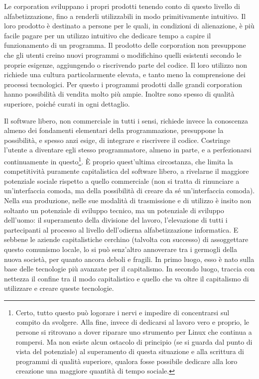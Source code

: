 \documentclass[../main]{subfiles}
\begin{document}
Le corporation sviluppano i propri prodotti tenendo conto di questo livello di alfabetizzazione, fino a renderli utilizzabili in modo primitivamente intuitivo. Il loro prodotto è destinato a persone per le quali, in condizioni di alienazione, è più facile pagare per un utilizzo intuitivo che dedicare tempo a capire il funzionamento di un programma. Il prodotto delle corporation non presuppone che gli utenti creino nuovi programmi o modifichino quelli esistenti secondo le proprie esigenze, aggiungendo o riscrivendo parte del codice. Il loro utilizzo non richiede una cultura particolarmente elevata, e tanto meno la comprensione dei processi tecnologici. Per questo i programmi prodotti dalle grandi corporation hanno possibilità di vendita molto più ampie. Inoltre sono spesso di qualità superiore, poiché curati in ogni dettaglio.

Il software libero, non commerciale in tutti i sensi, richiede invece la conoscenza almeno dei fondamenti elementari della programmazione, presuppone la possibilità, e spesso anzi esige, di integrare e riscrivere il codice. Costringe l'utente a diventare egli stesso programmatore, almeno in parte, e a perfezionarsi continuamente in questo\footnote{Certo, tutto questo può logorare i nervi e impedire di concentrarsi sul compito da svolgere. Alla fine, invece di dedicarsi al lavoro vero e proprio, le persone si ritrovano a dover riparare uno strumento per Linux che continua a rompersi. Ma non esiste alcun ostacolo di principio (se si guarda dal punto di vista del potenziale) al superamento di questa situazione e alla scrittura di programmi di qualità superiore, qualora fosse possibile dedicare alla loro creazione una maggiore quantità di tempo sociale.}. È proprio quest'ultima circostanza, che limita la competitività puramente capitalistica del software libero, a rivelarne il maggiore potenziale sociale rispetto a quello commerciale (non si tratta di rinunciare a un'interfaccia comoda, ma della possibilità di creare da sé un'interfaccia comoda). Nella sua produzione, nelle sue modalità di trasmissione e di utilizzo è insito non soltanto un potenziale di sviluppo tecnico, ma un potenziale di sviluppo dell'uomo: il superamento della divisione del lavoro, l'elevazione di tutti i partecipanti al processo al livello dell'odierna alfabetizzazione informatica. E sebbene le aziende capitalistiche cerchino (talvolta con successo) di assoggettare questo comunismo locale, lo si può senz'altro annoverare tra i germogli della nuova società, per quanto ancora deboli e fragili. In primo luogo, esso è nato sulla base delle tecnologie più avanzate per il capitalismo. In secondo luogo, traccia con nettezza il confine tra il modo capitalistico e quello che va oltre il capitalismo di utilizzare e creare queste tecnologie.
\end{document}
